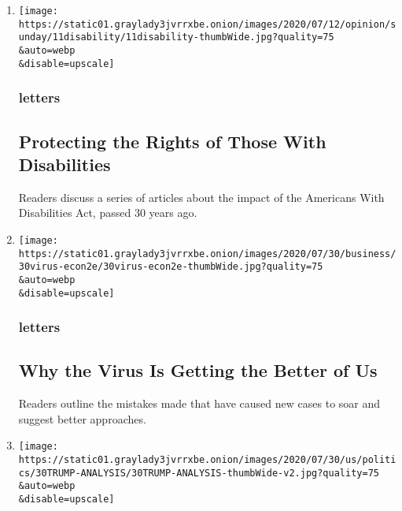 \begin{enumerate}
\def\labelenumi{\arabic{enumi}.}
\item
  \href{/2020/08/01/opinion/letters/disability-law.html}{}

  \texttt{[image: https://static01.graylady3jvrrxbe.onion/images/2020/07/12/opinion/sunday/11disability/11disability-thumbWide.jpg?quality=75\\\&auto=webp\\\&disable=upscale]}

  \hypertarget{letters}{%
  \subsubsection{letters}\label{letters}}

  \hypertarget{protecting-the-rights-of-those-with-disabilities}{%
  \subsection{Protecting the Rights of Those With
  Disabilities}\label{protecting-the-rights-of-those-with-disabilities}}

  Readers discuss a series of articles about the impact of the Americans
  With Disabilities Act, passed 30 years ago.
\item
  \href{/2020/07/31/opinion/letters/coronavirus-economy.html}{}

  \texttt{[image: https://static01.graylady3jvrrxbe.onion/images/2020/07/30/business/30virus-econ2e/30virus-econ2e-thumbWide.jpg?quality=75\\\&auto=webp\\\&disable=upscale]}

  \hypertarget{letters-1}{%
  \subsubsection{letters}\label{letters-1}}

  \hypertarget{why-the-virus-is-getting-the-better-of-us}{%
  \subsection{Why the Virus Is Getting the Better of
  Us}\label{why-the-virus-is-getting-the-better-of-us}}

  Readers outline the mistakes made that have caused new cases to soar
  and suggest better approaches.
\item
  \href{/2020/07/31/opinion/letters/trump-election.html}{}

  \texttt{[image: https://static01.graylady3jvrrxbe.onion/images/2020/07/30/us/politics/30TRUMP-ANALYSIS/30TRUMP-ANALYSIS-thumbWide-v2.jpg?quality=75\\\&auto=webp\\\&disable=upscale]}


\end{enumerate}
